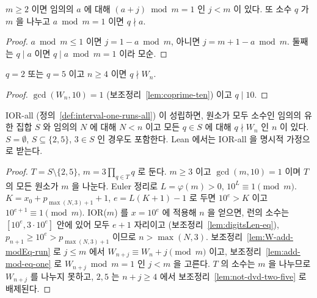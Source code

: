 \begin{lemma}
  \label{lem:add-mod-eq-one}
  \leanok
  \(m \ge 2\) 이면 임의의 \(a\) 에 대해 \((a + j) \bmod m = 1\) 인 \(j < m\) 이 있다.
  또 소수 \(q\) 가 \(m\) 을 나누고 \(a \bmod m = 1\) 이면 \(q \nmid a\).
\end{lemma}
\begin{proof}
  \leanok
  \(a \bmod m \le 1\) 이면 \(j = 1 - a \bmod m\), 아니면 \(j = m + 1 - a \bmod m\).
  둘째는 \(q \mid a\) 이면 \(q \mid a \bmod m = 1\) 이라 모순.
\end{proof}

\begin{lemma}[\(2, 5\) 의 배제]
  \label{lem:not-dvd-two-five}
  \leanok
  \(q = 2\) 또는 \(q = 5\) 이고 \(n \ge 4\) 이면 \(q \nmid W_n\).
\end{lemma}
\begin{proof}
  \leanok
  \(\gcd(W_n, 10) = 1\) (보조정리~\ref{lem:coprime-ten}) 이고 \(q \mid 10\).
\end{proof}

\begin{theorem}
  \label{thm:finite-avoid-one-runs}
  \leanok
  IOR-all (정의~\ref{def:interval-one-runs-all}) 이 성립하면, 원소가 모두 소수인 임의의 유한 집합 \(S\) 와
  임의의 \(N\) 에 대해 \(N < n\) 이고 모든 \(q \in S\) 에 대해 \(q \nmid W_n\) 인 \(n\) 이 있다.
  \(S = \emptyset\), \(S \subseteq \{2, 5\}\), \(3 \in S\) 인 경우도 포함한다. Lean 에서는 IOR-all 을 명시적 가정으로 받는다.
\end{theorem}
\begin{proof}
  \leanok
  \(T = S \setminus \{2, 5\}\), \(m = 3 \prod_{q \in T} q\) 로 둔다. \(m \ge 3\) 이고 \(\gcd(m, 10) = 1\) 이며
  \(T\) 의 모든 원소가 \(m\) 을 나눈다. Euler 정리로 \(L = \varphi(m) > 0\), \(10^L \equiv 1 \pmod m\).
  \(K = x_0 + p_{\max(N,3)+1} + 1\), \(e = L(K+1) - 1\) 로 두면 \(10^e > K\) 이고 \(10^{e+1} \equiv 1 \pmod m\).
  IOR(\(m\)) 를 \(x = 10^e\) 에 적용해 \(n\) 을 얻으면, 런의 소수는 \([10^e, 3 \cdot 10^e]\) 안에 있어 모두 \(e+1\) 자리이고
  (보조정리~\ref{lem:digitsLen-eq}), \(p_{n+1} \ge 10^e > p_{\max(N,3)+1}\) 이므로 \(n > \max(N, 3)\).
  보조정리~\ref{lem:W-add-modEq-run} 로 \(j \le m\) 에서 \(W_{n+j} \equiv W_n + j \pmod m\) 이고,
  보조정리~\ref{lem:add-mod-eq-one} 로 \(W_{n+j} \bmod m = 1\) 인 \(j < m\) 을 고른다.
  \(T\) 의 소수는 \(m\) 을 나누므로 \(W_{n+j}\) 를 나누지 못하고, \(2, 5\) 는 \(n + j \ge 4\) 에서
  보조정리~\ref{lem:not-dvd-two-five} 로 배제된다.
\end{proof}

